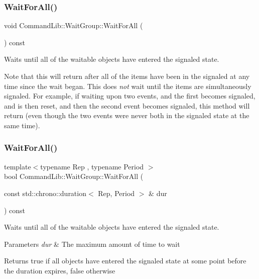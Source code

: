 \subsubsection{\texorpdfstring{Wait\+For\+All()}{WaitForAll()}\hspace{0.1cm}{\footnotesize\ttfamily [1/3]}}
{\footnotesize\ttfamily void Command\+Lib\+::\+Wait\+Group\+::\+Wait\+For\+All (\begin{DoxyParamCaption}{ }\end{DoxyParamCaption}) const}



Waits until all of the waitable objects have entered the signaled state.

Note that this will return after all of the items have been in the signaled at any time since the wait began. This does {\itshape not} wait until the items are simultaneously signaled. For example, if waiting upon two events, and the first becomes signaled, and is then reset, and then the second event becomes signaled, this method will return (even though the two events were never both in the signaled state at the same time). \mbox{\label{class_command_lib_1_1_wait_group_a490ab91ba70877fa5aa6567fbfdec9ad}} 
\subsubsection{\texorpdfstring{Wait\+For\+All()}{WaitForAll()}\hspace{0.1cm}{\footnotesize\ttfamily [2/3]}}
{\footnotesize\ttfamily template$<$typename Rep , typename Period $>$ \\
bool Command\+Lib\+::\+Wait\+Group\+::\+Wait\+For\+All (\begin{DoxyParamCaption}\item[{const std\+::chrono\+::duration$<$ Rep, Period $>$ \&}]{dur }\end{DoxyParamCaption}) const\hspace{0.3cm}{\ttfamily [inline]}}



Waits until all of the waitable objects have entered the signaled state.


\begin{DoxyParams}{Parameters}
{\em dur} & The maximum amount of time to wait\\
\hline
\end{DoxyParams}
\begin{DoxyReturn}{Returns}
true if all objects have entered the signaled state at some point before the duration expires, false otherwise 
\end{DoxyReturn}


